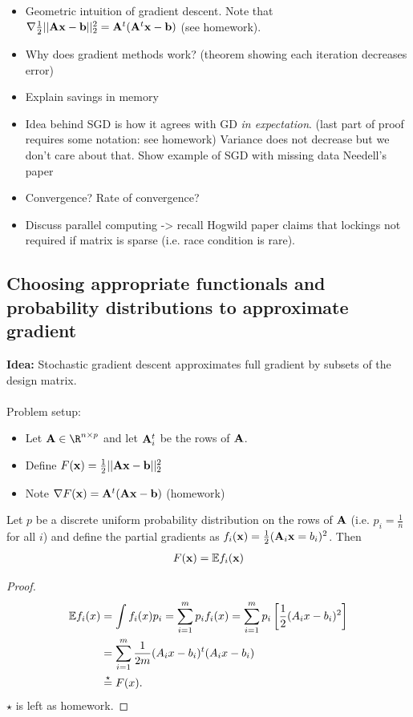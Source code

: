 \documentclass[./some_latex_template.tex]{subfiles}
\begin{document}
\begin{itemize}
	\item Geometric intuition of gradient descent. Note that $\nabla \frac{1}{2}||\mathbf{A}\mathbf{x} - \mathbf{b}||_2^2 = \mathbf{A}^t(\mathbf{A}^t\mathbf{x} - \mathbf{b})$ (see homework).
	\item Why does gradient methods work? (theorem showing each iteration decreases error)
	\item Explain savings in memory
	\item Idea behind SGD is how it agrees with GD \textit{in expectation}. (last part of proof requires some notation: see homework) Variance does not decrease but we don't care about that. Show example of SGD with missing data Needell's paper
	\item Convergence? Rate of convergence?
	\item Discuss parallel computing -> recall Hogwild paper claims that lockings not required if matrix is sparse (i.e. race condition is rare). 
\end{itemize}

\subsection{Choosing appropriate functionals and probability distributions to approximate gradient}

\textbf{Idea:} Stochastic gradient descent approximates full gradient by subsets of the design matrix. \\
\\
Problem setup:
\begin{itemize}
	\item Let $\bA \in \R^{n \times p}$ and let $\mathbf{A}_i^t$ be the rows of $\mathbf{A}$.
	\item Define $F(\mathbf{x}) = \frac{1}{2}||\mathbf{A}\mathbf{x} - \mathbf{b}||_2^2$
	\item Note $\nabla F(\mathbf{x}) = \mathbf{A}^t(\mathbf{A}\mathbf{x} - \mathbf{b})$ (homework)
\end{itemize}

\begin{theorembox}{}{}
Let $p$ be a discrete uniform probability distribution on the rows of $\mathbf{A}$ (i.e. $p_i = \frac{1}{n}$ for all $i$) and define the partial gradients as $f_i(\mathbf{x}) = \frac{1}{2}(\mathbf{A}_i \mathbf{x} = b_i)^2$. Then 
\begin{align*}
	F(\mathbf{x}) = \mathbb{E} f_i(\mathbf{x})
\end{align*}
\end{theorembox}

\begin{proof}
\begin{align*}
	\mathbb{E} f_i(x) 
	&= \int f_i(x) p_i = \sum_{i=1}^m p_i f_i(x) = \sum_{i=1}^m p_i\left[ \frac{1}{2}  (A_i x - b_i)^2 \right]\\
	&= \sum_{i=1}^{m} \frac{1}{2m} (A_ix - b_i)^t (A_ix - b_i)\\
	&\stackrel{\star}{=} F(x).
\end{align*}
$\star$ is left as homework. 
\end{proof}
\end{document}
